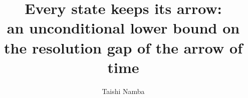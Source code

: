 \documentclass[aps,pre,twocolumn,superscriptaddress,nofootinbib]{revtex4-2}
\begin{document}
\title{\texorpdfstring{Every state keeps its arrow:\\ an unconditional lower bound on the resolution gap of the arrow of time}{Every state keeps its arrow: an unconditional lower bound on the resolution gap of the arrow of time}}

\author{Taishi Namba}

\begin{abstract}

\end{abstract}

\maketitle












\appendix
\makeatletter{}\makeatother
\renewcommand{\thetheorem}{\thesection\arabic{theorem}}
\setcounter{theorem}{0}







\end{document}
